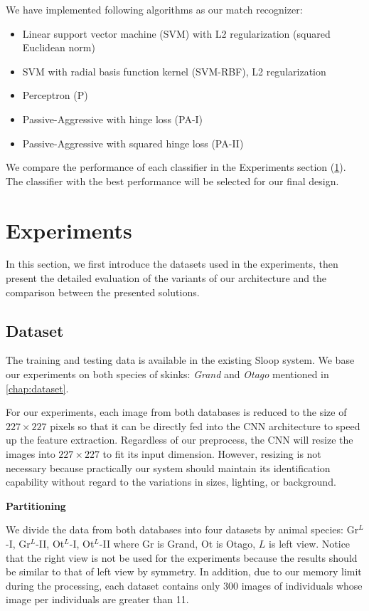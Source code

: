 We have implemented following algorithms as our match recognizer:
\begin{itemize}
  \item Linear support vector machine (SVM) with L2 regularization (squared
    Euclidean norm)
  \item SVM with radial basis function kernel (SVM-RBF), L2 regularization
  \item Perceptron (P)
  \item Passive-Aggressive with hinge loss (PA-I)
  \item Passive-Aggressive with squared hinge loss (PA-II)
\end{itemize}

We compare the performance of each classifier in the Experiments section
(\ref{experiments}). The classifier with the best performance will be selected
for our final design.

\section{Experiments} \label{experiments}

In this section, we first introduce the datasets used in the experiments, then
present the detailed evaluation of the variants of our architecture and the
comparison between the presented solutions.

\subsection{Dataset}

The training and testing data is available in the existing Sloop system. We
base our experiments on both species of skinks: \emph{Grand} and \emph{Otago}
mentioned in \ref{chap:dataset}.

For our experiments, each image from both databases is reduced to the size of
$227 \times 227$ pixels so that it can be directly fed into the CNN
architecture to speed up the feature extraction. Regardless of our preprocess,
the CNN will resize the images into $227 \times 227$ to fit its input
dimension. However, resizing is not necessary because practically our system
should maintain its identification capability without regard to the variations
in sizes, lighting, or background.

\textbf{Partitioning}

We divide the data from both databases into four datasets by animal species:
Gr$^{L}$-I, Gr$^{L}$-II, Ot$^{L}$-I, Ot$^{L}$-II where Gr is Grand, Ot is
Otago, $L$ is left view. Notice that the right view is not be used for the
experiments because the results should be similar to that of left view by
symmetry. In addition, due to our memory limit during the processing, each
dataset contains only 300 images of individuals whose image per individuals are
greater than 11.

